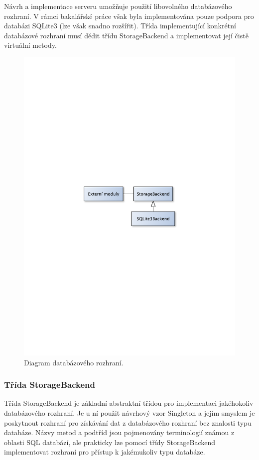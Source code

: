 Návrh a implementace serveru umožňuje použití libovolného databázového rozhraní.
V rámci bakalářské práce však byla implementována 
pouze podpora pro databázi SQLite3 (lze však snadno rozšířit). Třída implementující konkrétní databázové rozhraní musí dědit třídu StorageBackend a implementovat
její čistě virtuální metody.

\begin{figure}[h]
\centering
\includegraphics[trim=12cm 12cm 12cm 12cm, scale=0.7]{fig/imp_databaze}
\caption{Diagram databázového rozhraní.}
\label{fig:FigureExample}
\end{figure}

\subsubsection{Třída StorageBackend}

Třída StorageBackend je základní abstraktní třídou pro implementaci jakéhokoliv databázového rozhraní.
Je u ní použit návrhový vzor Singleton %
a jejím smyslem je poskytnout rozhraní pro získávání dat z databázového rozhraní bez znalosti
typu databáze. Názvy metod a podtříd jsou pojmenovány terminologií známou z
oblasti SQL databází, %
 ale prakticky
lze pomocí třídy StorageBackend implementovat rozhraní pro přístup k jakémukoliv typu databáze.

